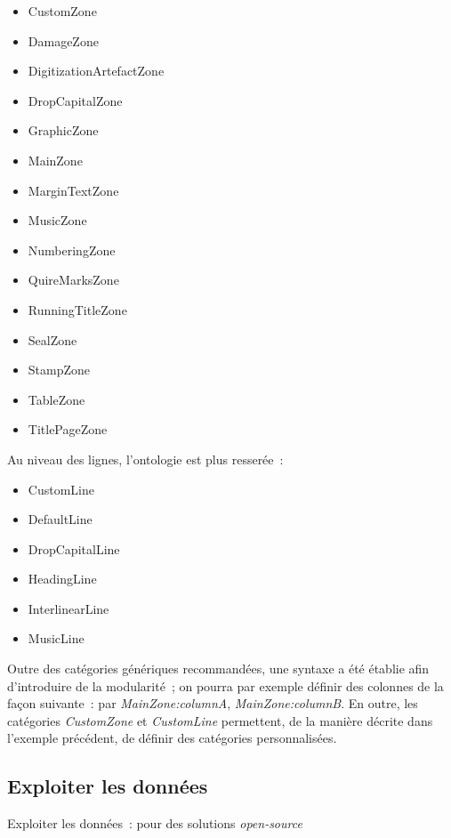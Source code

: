 \documentclass[a4paper,12pt,twoside]{book}
\begin{document}
				\begin{itemize}
					\item
					CustomZone
					\item
					DamageZone
					\item
					DigitizationArtefactZone
					\item
					DropCapitalZone
					\item
					GraphicZone
					\item
					MainZone
					\item
					MarginTextZone
					\item
					MusicZone
					\item
					NumberingZone
					\item
					QuireMarksZone
					\item
					RunningTitleZone
					\item
					SealZone
					\item
					StampZone
					\item
					TableZone
					\item
					TitlePageZone
				\end{itemize}
				
				Au niveau des lignes, l'ontologie est plus resserée~:
				
				\begin{itemize}
					\item
					CustomLine
					\item
					DefaultLine
					\item
					DropCapitalLine
					\item
					HeadingLine
					\item
					InterlinearLine
					\item
					MusicLine
				\end{itemize}
				
				Outre des catégories génériques recommandées, une syntaxe a été établie
				afin d'introduire de la modularité~; on pourra par exemple définir des
				colonnes de la façon suivante~: par \textit{MainZone:columnA},
				\textit{MainZone:columnB}. En outre, les catégories \textit{CustomZone} et
				\textit{CustomLine} permettent, de la manière décrite dans l'exemple
				précédent, de définir des catégories personnalisées.
			
			\subsection{Exploiter les données}{Exploiter les données~: pour des solutions \textit{open-source}}
			
\end{document}
